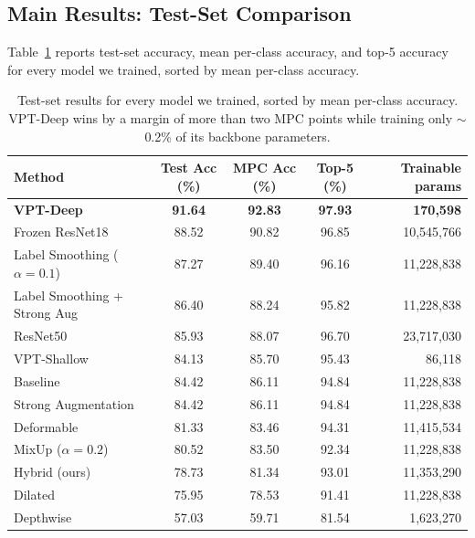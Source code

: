 \subsection{Main Results: Test-Set Comparison}

Table~\ref{tab:main-results} reports test-set accuracy, mean per-class accuracy, and top-5 accuracy for every model we trained, sorted by mean per-class accuracy.

\begin{table}[H]
\centering
\small
\begin{tabular}{lcccr}
\toprule
Method & Test Acc (\%) & MPC Acc (\%) & Top-5 (\%) & Trainable params \\
\midrule
\textbf{VPT-Deep}              & \textbf{91.64} & \textbf{92.83} & \textbf{97.93} & \textbf{170{,}598} \\
Frozen ResNet18                & 88.52 & 90.82 & 96.85 & 10{,}545{,}766 \\
Label Smoothing ($\alpha{=}0.1$) & 87.27 & 89.40 & 96.16 & 11{,}228{,}838 \\
Label Smoothing + Strong Aug   & 86.40 & 88.24 & 95.82 & 11{,}228{,}838 \\
ResNet50                       & 85.93 & 88.07 & 96.70 & 23{,}717{,}030 \\
VPT-Shallow                    & 84.13 & 85.70 & 95.43 & 86{,}118 \\
Baseline                       & 84.42 & 86.11 & 94.84 & 11{,}228{,}838 \\
Strong Augmentation            & 84.42 & 86.11 & 94.84 & 11{,}228{,}838 \\
Deformable                     & 81.33 & 83.46 & 94.31 & 11{,}415{,}534 \\
MixUp ($\alpha{=}0.2$)         & 80.52 & 83.50 & 92.34 & 11{,}228{,}838 \\
Hybrid (ours)                  & 78.73 & 81.34 & 93.01 & 11{,}353{,}290 \\
Dilated                        & 75.95 & 78.53 & 91.41 & 11{,}228{,}838 \\
Depthwise                      & 57.03 & 59.71 & 81.54 & 1{,}623{,}270 \\
\bottomrule
\end{tabular}
\caption{Test-set results for every model we trained, sorted by mean per-class accuracy. VPT-Deep wins by a margin of more than two MPC points while training only $\sim$0.2\% of its backbone parameters.}
\label{tab:main-results}
\end{table}

